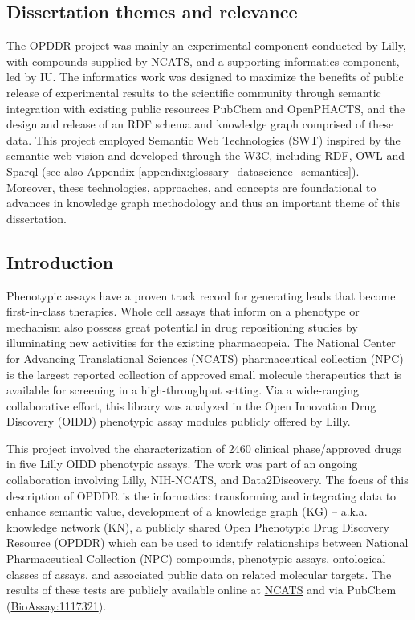\subsection{Dissertation themes and relevance}

The OPDDR project was mainly an experimental component conducted by Lilly, with compounds supplied by NCATS, and a supporting informatics component, led by IU. The informatics work was designed to maximize the benefits of public release of experimental results to the scientific community through semantic integration with existing public resources PubChem and OpenPHACTS, and the design and release of an RDF schema and knowledge graph comprised of these data. This project employed Semantic Web Technologies (SWT) inspired by the semantic web vision \cite{Berners-Lee2001-wi} and developed through the W3C, including RDF, OWL and Sparql (see also Appendix \ref{appendix:glossary_datascience_semantics}). Moreover, these technologies, approaches, and concepts are foundational to advances in knowledge graph methodology and thus an important theme of this dissertation.

\subsection{Introduction}

Phenotypic assays have a proven track record for generating leads that become first-in-class therapies. Whole cell assays that inform on a phenotype or mechanism also possess great potential in drug repositioning studies by illuminating new activities for the existing pharmacopeia. The National Center for Advancing Translational Sciences (NCATS) pharmaceutical collection (NPC) is the largest reported collection of approved small molecule therapeutics that is available for screening in a high-throughput setting. Via a wide-ranging collaborative effort, this library was analyzed in the Open Innovation Drug Discovery (OIDD) phenotypic assay modules publicly offered by Lilly. 

This project involved the characterization of 2460 clinical phase/approved drugs in five Lilly OIDD phenotypic assays. The work was part of an ongoing collaboration involving Lilly, NIH-NCATS, and Data2Discovery.  The focus of this description of OPDDR is the informatics: transforming and integrating data to enhance semantic value, development of a knowledge graph (KG) -- a.k.a. knowledge network (KN), a publicly shared Open Phenotypic Drug Discovery Resource (OPDDR) which can be used to identify relationships between National Pharmaceutical Collection (NPC) compounds, phenotypic assays, ontological classes of assays, and associated public data on related molecular targets. The results of these tests are publicly available online at \href{https://www.ncats.nih.gov/expertise/preclinical/pd2}{NCATS} and via PubChem (\href{https://pubchem.ncbi.nlm.nih.gov/bioassay/1117321}{BioAssay:1117321}).

